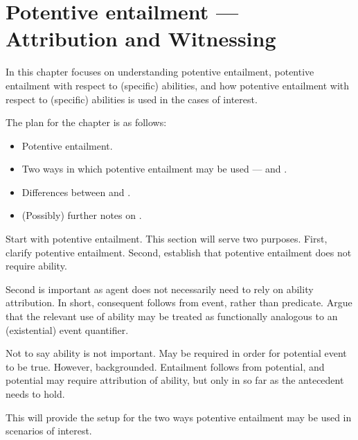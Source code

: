 
\chapter{Potentive entailment --- Attribution and Witnessing}
\label{cha:potent-infer-attr}

\begin{note}[Overview]
  In this chapter focuses on understanding potentive entailment, potentive entailment with respect to (specific) abilities, and how potentive entailment with respect to (specific) abilities is used in the cases of interest.
\end{note}

\begin{note}
  The plan for the chapter is as follows:
  \begin{itemize}
  \item Potentive entailment.
  \item Two ways in which potentive entailment may be used --- \AR{} and \WR{}.
  \item Differences between \AR{} and \WR{}.
  \item (Possibly) further notes on \WR{}.
  \end{itemize}
\end{note}

\begin{note}
  Start with potentive entailment.
  This section will serve two purposes.
  First, clarify potentive entailment.
  Second, establish that potentive entailment does not require ability.

  Second is important as agent does not necessarily need to rely on ability attribution.
  In short, consequent follows from event, rather than predicate.
  Argue that the relevant use of ability may be treated as functionally analogous to an (existential) event quantifier.

  Not to say ability is not important.
  May be required in order for potential event to be true.
  However, backgrounded.
  Entailment follows from potential, and potential may require attribution of ability, but only in so far as the antecedent needs to hold.

  This will provide the setup for the two ways potentive entailment may be used in scenarios of interest.
\end{note}

